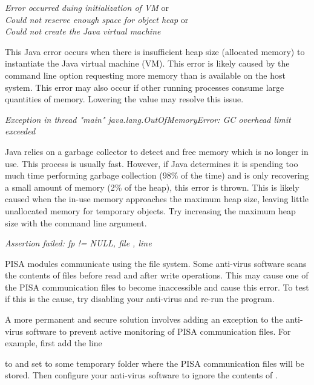 \noindent
\textit{Error occurred duing initialization of VM} or\\
\textit{Could not reserve enough space for object heap} or\\
\textit{Could not create the Java virtual machine}
\begin{indented}
  This Java error occurs when there is insufficient heap size (allocated memory) to instantiate the Java virtual machine (VM).  This error is likely caused by the  command line option requesting more memory than is available on the host system.  This error may also occur if other running processes consume large quantities of memory.  Lowering the  value may resolve this issue.
\end{indented}

\noindent
\textit{Exception in thread "main" java.lang.OutOfMemoryError: GC overhead limit exceeded}
\begin{indented}
  Java relies on a garbage collector to detect and free memory which is no longer in use.  This process is usually fast.  However, if Java determines it is spending too much time performing garbage collection (98\% of the time) and is only recovering a small amount of memory (2\% of the heap), this error is thrown.  This is likely caused when the in-use memory approaches the maximum heap size, leaving little unallocated memory for temporary objects.  Try  increasing the maximum heap size with the  command line argument.
\end{indented}

\noindent
\textit{Assertion failed: fp != NULL, file , line }
\begin{indented}
  PISA modules communicate using the file system.  Some anti-virus software scans the contents of files before read and after write operations.  This may cause one of the PISA communication files to become inaccessible and cause this error.  To test if this is the cause, try disabling your anti-virus and re-run the program.
  
  A more permanent and secure solution involves adding an exception to the anti-virus software to prevent active monitoring of PISA communication files. For example, first add the line
  \begin{indented}
  \end{indented}
  to  and set  to some temporary folder where the PISA communication files will be stored.  Then configure your anti-virus software to ignore the contents of .
\end{indented}

